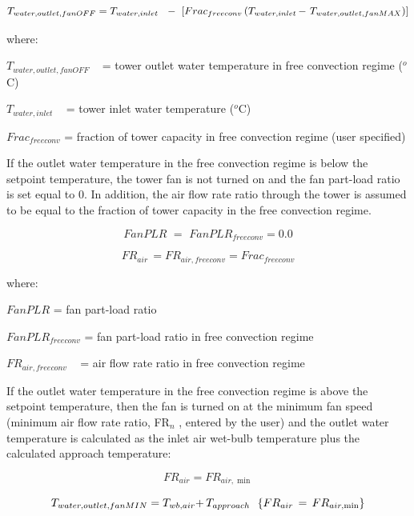 \begin{equation}
{T_{water,outlet,fanOFF}} = {T_{water,inlet}}\,\,\,\, - \,\,\left[ {Fra{c_{freeconv}}\left( {{T_{water,inlet}}\,{\rm{ - }}\,\,{T_{water,outlet,fanMAX}}} \right)} \right]
\end{equation}

where:

\({T_{water,outlet,fanOFF}}\) ~ = tower outlet water temperature in free convection regime (\(^{o}\)C)

\({T_{water,inlet}}\) ~ = tower inlet water temperature (\(^{o}\)C)

\(Fra{c_{freeconv}}\) = fraction of tower capacity in free convection regime (user specified)

If the outlet water temperature in the free convection regime is below the setpoint temperature, the tower fan is not turned on and the fan part-load ratio is set equal to 0. In addition, the air flow rate ratio through the tower is assumed to be equal to the fraction of tower capacity in the free convection regime.

\begin{equation}
FanPLR\,\, = \,\,FanPL{R_{freeconv}} = 0.0
\end{equation}

\begin{equation}
F{R_{air}}\, = F{R_{air,freeconv}} = Fra{c_{freeconv}}
\end{equation}

where:

\(FanPLR\) = fan part-load ratio

\(FanPL{R_{freeconv}}\) = fan part-load ratio in free convection regime

\(F{R_{air,freeconv}}\) ~ = air flow rate ratio in free convection regime

If the outlet water temperature in the free convection regime is above the setpoint temperature, then the fan is turned on at the minimum fan speed (minimum air flow rate ratio, FR\(_{n}\) , entered by the user) and the outlet water temperature is calculated as the inlet air wet-bulb temperature plus the calculated approach temperature:

\begin{equation}
F{R_{air}} = F{R_{air,\min }}
\end{equation}

\begin{equation}
{T_{water,outlet,fanMIN}} = {T_{wb,air}}{\rm{ + }}\,{T_{approach}}\,\,\,\,\{ F{R_{air}}\, = \,F{R_{air,\min }}\}
\end{equation}

